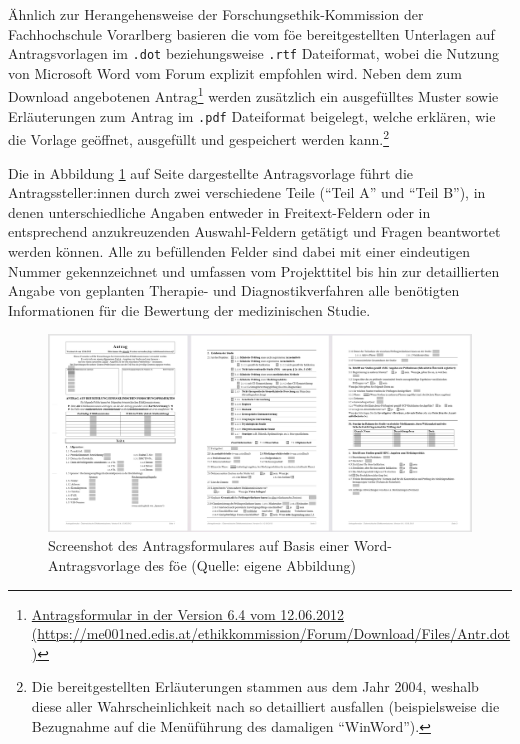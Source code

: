 \documentclass[a4paper,12pt,twoside]{scrreprt}
\begin{document}
Ähnlich zur Herangehensweise der Forschungsethik-Kommission der Fachhochschule Vorarlberg basieren die vom \ac{föe} bereitgestellten Unterlagen auf Antragsvorlagen im \texttt{.dot} beziehungsweise \texttt{.rtf} Dateiformat, wobei die Nutzung von Microsoft Word vom Forum explizit empfohlen wird. Neben dem zum Download angebotenen Antrag\footnote{\href{https://me001ned.edis.at/ethikkommission/Forum/Download/Files/Antr.dot}{Antragsformular in der Version 6.4 vom 12.06.2012 (\url{https://me001ned.edis.at/ethikkommission/Forum/Download/Files/Antr.dot})}} werden zusätzlich ein ausgefülltes Muster sowie Erläuterungen zum Antrag im \texttt{.pdf} Dateiformat beigelegt, welche erklären, wie die Vorlage geöffnet, ausgefüllt und gespeichert werden kann.\footnote{Die bereitgestellten Erläuterungen stammen aus dem Jahr 2004, weshalb diese aller Wahrscheinlichkeit nach so detailliert ausfallen (beispielsweise die Bezugnahme auf die Menüführung des damaligen \enquote{WinWord}).} \cite{ethikkommission_der_medizinischen_universitat_graz_download_2012}

Die in Abbildung \ref{fig:dokumentenvorlage-föe} auf Seite \pageref{fig:dokumentenvorlage-föe} dargestellte Antragsvorlage führt die Antragssteller:innen durch zwei verschiedene Teile (\enquote{Teil A} und \enquote{Teil B}), in denen unterschiedliche Angaben entweder in Freitext-Feldern oder in entsprechend anzukreuzenden Auswahl-Feldern getätigt und Fragen beantwortet werden können. Alle zu befüllenden Felder sind dabei mit einer eindeutigen Nummer gekennzeichnet und umfassen vom Projekttitel bis hin zur detaillierten Angabe von geplanten Therapie- und Diagnostikverfahren alle benötigten Informationen für die Bewertung der medizinischen Studie.

\begin{figure}[ht]
    \centering
    \includegraphics[scale=0.21]{thesis/images/Luidold_Word-Vorlage-Forum-Oesterreichischer-Ethikkommissionen.png}
    \caption[Screenshot der Word-Antragsvorlage des Forums Österreichischer Ethikkommissionen]{Screenshot des Antragsformulares auf Basis einer Word-Antragsvorlage des \ac{föe} (Quelle: eigene Abbildung)}
    \label{fig:dokumentenvorlage-föe}
\end{figure}
\end{document}
